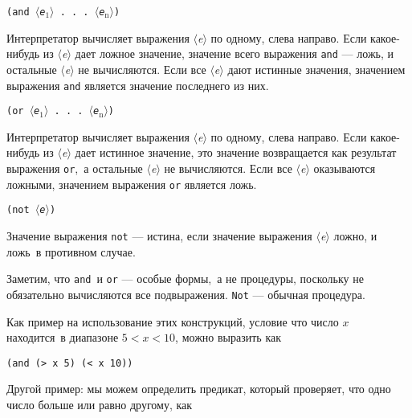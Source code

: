 \begin{plainlist}
\item
{\tt (and \textit{$\langle$e${}_{\mbox{1}}$$\rangle$}
  . . . \textit{$\langle$e${}_{\mbox{n}}$$\rangle$})}

Интерпретатор вычисляет выражения 
\textit{$\langle$e$\rangle$} по одному, слева направо. Если
какое-нибудь из \textit{$\langle$e$\rangle$} дает ложное значение,
значение всего выражения {\tt and} --- ложь, и
остальные \textit{$\langle$e$\rangle$} не вычисляются. Если все
\textit{$\langle$e$\rangle$} дают истинные значения, значением
выражения {\tt and} является значение последнего из
них.

\item
{\tt (or \textit{$\langle$e${}_{\mbox{1}}$$\rangle$}  . . . \textit{$\langle$e${}_{\mbox{n}}$$\rangle$})}

Интерпретатор вычисляет выражения
\textit{$\langle$e$\rangle$} по одному, слева направо. Если
какое-нибудь из \textit{$\langle$e$\rangle$} дает истинное значение, 
это значение возвращается как результат выражения
{\tt or},~а остальные \textit{$\langle$e$\rangle$} не 
вычисляются.  Если все \textit{$\langle$e$\rangle$} оказываются
ложными, значением выражения {\tt or} является
ложь.

\item
{\tt (not \textit{$\langle$e$\rangle$})}

Значение выражения {\tt not} ---
истина, если значение выражения
\textit{$\langle$e$\rangle$} ложно, 
и ложь~в противном случае.
\end{plainlist}

Заметим, что {\tt and}~и {\tt or} ---
особые формы,~а не
процедуры, поскольку не обязательно
вычисляются все подвыражения. {\tt Not} --- обычная
процедура.

Как пример на использование этих конструкций, условие
что число $x$ находится~в диапазоне $5 < x <
10$, можно выразить как

\begin{Verbatim}[fontsize=\small]
(and (> x 5) (< x 10))
\end{Verbatim}
Другой пример: мы можем определить предикат, который проверяет,
что одно число больше или равно другому, как

